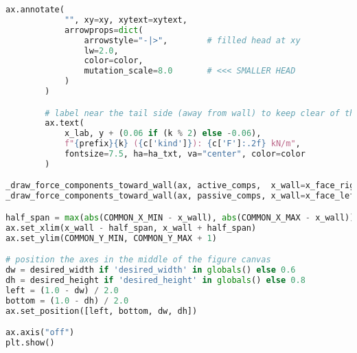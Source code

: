 \begin{lstlisting}[language=Python]
        ax.annotate(
            "", xy=xy, xytext=xytext,
            arrowprops=dict(
                arrowstyle="-|>",        # filled head at xy
                lw=2.0,
                color=color,
                mutation_scale=8.0       # <<< SMALLER HEAD
            )
        )

        # label near the tail side (away from wall) to keep clear of the head/PoA
        ax.text(
            x_lab, y + (0.06 if (k % 2) else -0.06),
            f"{prefix}{k} ({c['kind']}): {c['F']:.2f} kN/m",
            fontsize=7.5, ha=ha_txt, va="center", color=color
        )

_draw_force_components_toward_wall(ax, active_comps,  x_wall=x_face_right, to_wall_sign=-1, color="red",  prefix="Fₐ")
_draw_force_components_toward_wall(ax, passive_comps, x_wall=x_face_left,  to_wall_sign=+1, color="navy", prefix="Fₚ")

half_span = max(abs(COMMON_X_MIN - x_wall), abs(COMMON_X_MAX - x_wall))
ax.set_xlim(x_wall - half_span, x_wall + half_span)
ax.set_ylim(COMMON_Y_MIN, COMMON_Y_MAX + 1)

# position the axes in the middle of the figure canvas
dw = desired_width if 'desired_width' in globals() else 0.6
dh = desired_height if 'desired_height' in globals() else 0.8
left = (1.0 - dw) / 2.0
bottom = (1.0 - dh) / 2.0
ax.set_position([left, bottom, dw, dh])

ax.axis("off")
plt.show()
\end{lstlisting}

